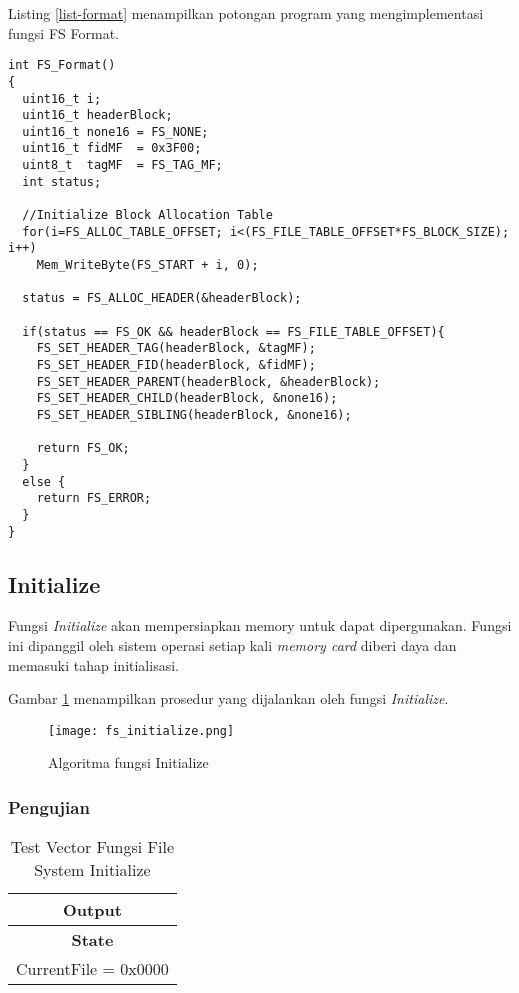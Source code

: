 Listing \ref{list-format} menampilkan potongan program yang mengimplementasi fungsi FS Format.

\begin{lstlisting}[caption={Listing Program Fungsi FS Format}, label={list-format}]
int FS_Format()
{
  uint16_t i;
  uint16_t headerBlock;
  uint16_t none16 = FS_NONE;
  uint16_t fidMF  = 0x3F00;
  uint8_t  tagMF  = FS_TAG_MF;
  int status;

  //Initialize Block Allocation Table
  for(i=FS_ALLOC_TABLE_OFFSET; i<(FS_FILE_TABLE_OFFSET*FS_BLOCK_SIZE); i++)
    Mem_WriteByte(FS_START + i, 0);

  status = FS_ALLOC_HEADER(&headerBlock);

  if(status == FS_OK && headerBlock == FS_FILE_TABLE_OFFSET){
    FS_SET_HEADER_TAG(headerBlock, &tagMF);
    FS_SET_HEADER_FID(headerBlock, &fidMF);
    FS_SET_HEADER_PARENT(headerBlock, &headerBlock);
    FS_SET_HEADER_CHILD(headerBlock, &none16);
    FS_SET_HEADER_SIBLING(headerBlock, &none16);

    return FS_OK;
  }
  else {
    return FS_ERROR;
  }
}

\end{lstlisting}

\subsection{Initialize}

Fungsi {\em Initialize} akan mempersiapkan memory untuk dapat dipergunakan. Fungsi ini dipanggil oleh sistem operasi setiap kali \textsl{memory card} diberi daya dan memasuki tahap initialisasi. 

Gambar \ref{fig-initialize} menampilkan prosedur yang dijalankan oleh fungsi {\em Initialize}.

\begin{figure}[h]
\centering
\texttt{[image: fs\_initialize.png]}
\caption{Algoritma fungsi Initialize}
\label{fig-initialize}
\end{figure}

\subsubsection{Pengujian}

\begin{table}[!h]
  \centering
  \begin{tabular}{ | c | }
    \hline
    \bf{Output} \\
    \hline
    \bf{State}\\
    \hline
    CurrentFile = 0x0000 \\
    \hline
  \end{tabular}
  \caption{Test Vector Fungsi File System Initialize}
  \label{tabel-test-initialize}
\end{table}

